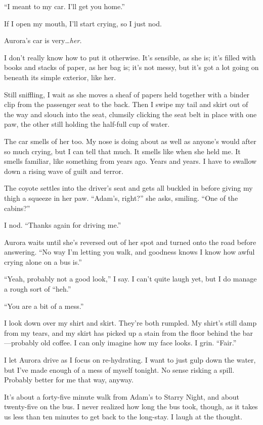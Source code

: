 ``I meant to my car. I'll get you home.''

If I open my mouth, I'll start crying, so I just nod.

\secdiv{}

\noindent Aurora's car is very\ldots{}\emph{her.}

I don't really know how to put it otherwise. It's sensible, as she is; it's filled with books and stacks of paper, as her bag is; it's not messy, but it's got a lot going on beneath its simple exterior, like her.

Still sniffling, I wait as she moves a sheaf of papers held together with a binder clip from the passenger seat to the back. Then I swipe my tail and skirt out of the way and slouch into the seat, clumsily clicking the seat belt in place with one paw, the other still holding the half-full cup of water.

The car smells of her too. My nose is doing about as well as anyone's would after so much crying, but I can tell that much. It smells like when she held me. It smells familiar, like something from years ago. Years and years. I have to swallow down a rising wave of guilt and terror.

The coyote settles into the driver's seat and gets all buckled in before giving my thigh a squeeze in her paw. ``Adam's, right?'' she asks, smiling. ``One of the cabins?''

I nod. ``Thanks again for driving me.''

Aurora waits until she's reversed out of her spot and turned onto the road before answering. ``No way I'm letting you walk, and goodness knows I know how awful crying alone on a bus is.''

``Yeah, probably not a good look,'' I say. I can't quite laugh yet, but I do manage a rough sort of ``heh.''

``You are a bit of a mess.''

I look down over my shirt and skirt. They're both rumpled. My shirt's still damp from my tears, and my skirt has picked up a stain from the floor behind the bar---probably old coffee. I can only imagine how my face looks. I grin. ``Fair.''

I let Aurora drive as I focus on re-hydrating. I want to just gulp down the water, but I've made enough of a mess of myself tonight. No sense risking a spill. Probably better for me that way, anyway.

It's about a forty-five minute walk from Adam's to Starry Night, and about twenty-five on the bus. I never realized how long the bus took, though, as it takes us less than ten minutes to get back to the long-stay. I laugh at the thought.

